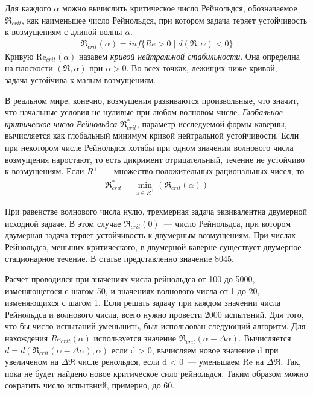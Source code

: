 Для каждого $\alpha$ можно вычислить критическое число Рейнольдся, обозначаемое $\Re_{crit}$, как наименьшее число Рейнольдся, при котором задача теряет устойчивость к возмущениям с длиной волны $\alpha$.
\begin{gather}
 \Re_{crit}(\alpha) = inf\{Re>0 \mid d(\Re,\alpha) < 0\}
\end{gather}
Кривую Re$_{crit}(\alpha)$ назавем \textit{кривой нейтральной стабильности}. Она определна на плоскости $(\Re,\alpha)$ при $\alpha > 0$. Во всех точках, лежищих ниже кривой,~--- задача устойчива к малым возмущениям. 

В реальном мире, конечно, возмущения развиваются произвольные, что значит, что начальные условия не нуливые при любом волновом числе. \textit{Глобальное критическое число Рейнольдса} $\Re_{crit}^*$, параметр исследуемой формы каверны, вычисляется как глобальный минимум кривой нейтральной устойчивости. Если при некотором числе Рейнольдся хотябы при одном значении волнового числа возмущения наростают, то есть дикримент отрицательный, течение не устойчиво к возмущениям. Если $R^+$~--- множество положительных рациональных чисел, то
\begin{gather}
 \Re_{crit}^* = \min_{\alpha \in R^+}(\Re_{crit}(\alpha))
\end{gather}

При равенстве волнового числа нулю, трехмерная задача эквивалентна двумерной исходной задаче. В этом случае $\Re_{crit}(0)$~--- число Рейнольдса, при котором двумерная задача теряет устойчивость к двумерным возмущениям. При числах Рейнольдса, меньших критического, в двумерной каверне существует двумерное стационарное течение. В статье \cite{lin-stability} представленно значение 8045.  

Расчет проводился при значениях числа рейнольдса от 100 до 5000, изменяющегося с шагом 50, и значениях волнового числа от 1 до 20, изменяющихся с шагом 1. Если решать задачу при каждом значении числа Рейнольдса и волнового числа, всего нужно провести 2000 испытвний. Для того, что бы число испытаний уменьшить, был использован следующий алгоритм. Для нахождения $Re_{crit}(\alpha)$ используется значение $\Re_{crit}(\alpha - \Delta\alpha)$. Вычисляется $d = d(\Re_{crit}(\alpha - \Delta\alpha), \alpha)$ если d > 0, вычисляем новое значение d при увеличеном на $\Delta \Re$ числе ренольдся, если d < 0~--- уменьшаем Re на $\Delta \Re$. Так, пока не будет найдено новое критическое сило рейнольдся. 
Таким образом можно сократить число испытвний, примерно, до 60. 

